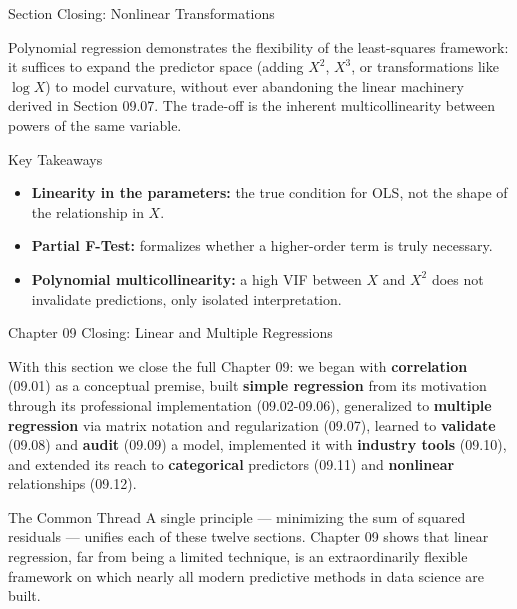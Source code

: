 \documentclass[10pt, aspectratio=169]{beamer}
\begin{document}
\begin{frame}{Section Closing: Nonlinear Transformations}
  \begin{reflexion}
    Polynomial regression demonstrates the flexibility of the least-squares framework: it suffices to expand the predictor space (adding $X^2$, $X^3$, or transformations like $\log X$) to model curvature, without ever abandoning the linear machinery derived in Section 09.07. The trade-off is the inherent multicollinearity between powers of the same variable.
  \end{reflexion}

  \vspace{0.2cm}
  \pause
  \begin{block}{Key Takeaways}
    \begin{itemize}\itemsep=0.08cm
      \item \textbf{Linearity in the parameters:} the true condition for OLS, not the shape of the relationship in $X$.
      \item \textbf{Partial F-Test:} formalizes whether a higher-order term is truly necessary.
      \item \textbf{Polynomial multicollinearity:} a high VIF between $X$ and $X^2$ does not invalidate predictions, only isolated interpretation.
    \end{itemize}
  \end{block}
\end{frame}

\begin{frame}{Chapter 09 Closing: Linear and Multiple Regressions}
  \scriptsize
  \begin{retoclase}
    With this section we close the full Chapter 09: we began with \textbf{correlation} (09.01) as a conceptual premise, built \textbf{simple regression} from its motivation through its professional implementation (09.02-09.06), generalized to \textbf{multiple regression} via matrix notation and regularization (09.07), learned to \textbf{validate} (09.08) and \textbf{audit} (09.09) a model, implemented it with \textbf{industry tools} (09.10), and extended its reach to \textbf{categorical} predictors (09.11) and \textbf{nonlinear} relationships (09.12).
  \end{retoclase}

  \vspace{0.08cm}
  \pause
  \begin{alertblock}{The Common Thread}
    A single principle --- minimizing the sum of squared residuals --- unifies each of these twelve sections. Chapter 09 shows that linear regression, far from being a limited technique, is an extraordinarily flexible framework on which nearly all modern predictive methods in data science are built.
  \end{alertblock}
\end{frame}
\end{document}
